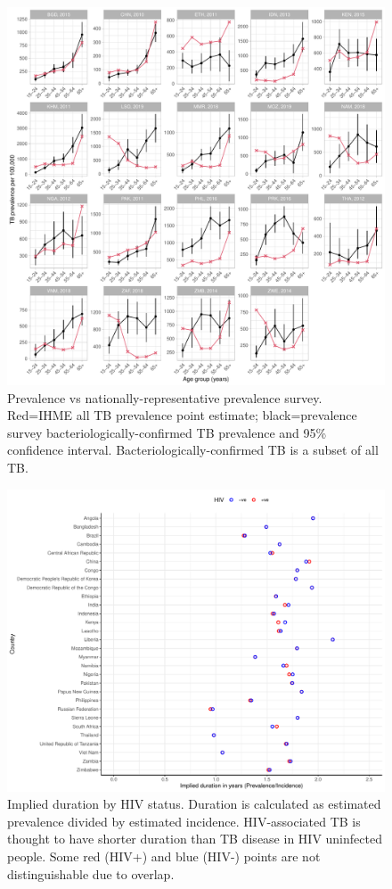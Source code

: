 \documentclass[12pt]{article}
\begin{document}
\begin{figure}
\centering
\includegraphics[width=1\textwidth]{../plots/aF3.pdf}
\caption[Prevalence vs prevalence survey.]{Prevalence vs
  nationally-representative prevalence survey. Red=IHME all TB prevalence point
  estimate; black=prevalence survey bacteriologically-confirmed TB prevalence
  and 95\% confidence interval. Bacteriologically-confirmed TB is a subset of
  all TB.}
\end{figure}

\FloatBarrier

\begin{figure}
  \centering
  \includegraphics[width=1\textwidth]{../plots/aF7.pdf}
  \caption[Implied duration by HIV status]{Implied duration by HIV status.
    Duration is calculated as estimated prevalence divided by estimated
    incidence. HIV-associated TB is thought to have shorter duration than TB
    disease in HIV uninfected people. Some red (HIV+) and blue (HIV-) points are not
    distinguishable due to overlap.}
\end{figure}
\end{document}
